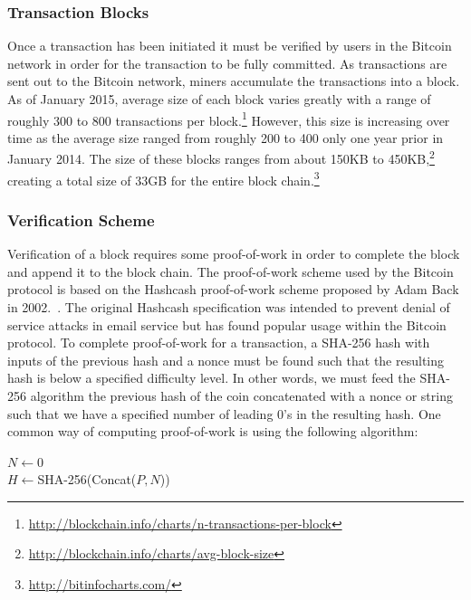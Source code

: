 \documentclass[11pt]{article}
\begin{document}
\subsubsection{Transaction Blocks}
Once a transaction has been initiated it must be verified by users in the Bitcoin network in order for the transaction
to be fully committed. As transactions are sent out to the Bitcoin network, miners accumulate the transactions into a
block. As of January 2015, average size of each block varies greatly with a range of roughly 300 to 800 transactions per
block.\footnote{\url{http://blockchain.info/charts/n-transactions-per-block}} However, this size is increasing over time
as the average size ranged from roughly 200 to 400 only one year prior in January 2014. The size of these blocks ranges
from about 150KB to 450KB,\footnote{\url{http://blockchain.info/charts/avg-block-size}} creating a total size of 33GB
for the entire block chain.\footnote{\url{http://bitinfocharts.com/}}

\subsubsection{Verification Scheme}
Verification of a block requires some proof-of-work in order to complete the block and append it to the block chain. The
proof-of-work scheme used by the Bitcoin protocol is based on the Hashcash proof-of-work scheme proposed by Adam Back in
2002.~\cite{back02}. The original Hashcash specification was intended to prevent denial of service attacks in email
service but has found popular usage within the Bitcoin protocol.  To complete proof-of-work for a transaction, a SHA-256
hash with inputs of the previous hash and a nonce must be found such that the resulting hash is below a specified
difficulty level. In other words, we must feed the SHA-256 algorithm the previous hash of the coin concatenated with a
nonce or string such that we have a specified number of leading 0's in the resulting hash. One common way of computing
proof-of-work is using the following algorithm:
\vspace{1em}\\
\begin{algorithm}[H]
    $N \gets 0$\\
    $H \gets ${\sc SHA-256({\sc Concat($P, N$)})}\\
\end{algorithm}
\vspace{1em}
\end{document}
